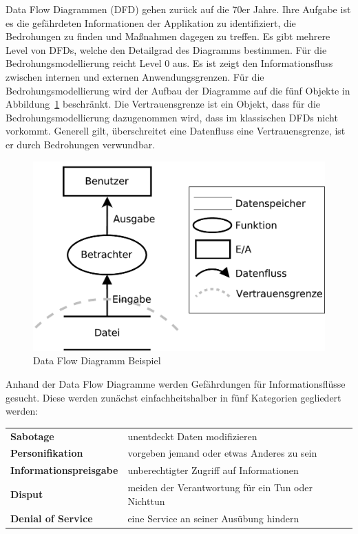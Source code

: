 \documentclass[11pt,a4paper]{report}
\begin{document}
Data Flow Diagrammen (DFD) gehen zurück auf die 70er Jahre. Ihre Aufgabe ist es die gefährdeten Informationen der Applikation zu identifiziert, die Bedrohungen zu finden und Maßnahmen dagegen zu treffen. Es gibt mehrere Level von DFDs, welche den Detailgrad des Diagramms bestimmen. Für die Bedrohungsmodellierung reicht Level 0 aus. Es ist zeigt den Informationsfluss zwischen internen und externen Anwendungsgrenzen. Für die Bedrohungsmodellierung wird der Aufbau der Diagramme auf die fünf Objekte in Abbildung~\ref{fig:dfd_intro} beschränkt. Die Vertrauensgrenze ist ein Objekt, dass für die Bedrohungsmodellierung dazugenommen wird, dass im klassischen DFDs nicht vorkommt. Generell gilt, überschreitet eine Datenfluss eine Vertrauensgrenze, ist er durch Bedrohungen verwundbar.

\begin{figure}[htbp]
\centering
\includegraphics[scale=0.4]{images/dfd_intro.pdf}
\caption{Data Flow Diagramm Beispiel}
\label{fig:dfd_intro}
\end{figure}

Anhand der Data Flow Diagramme werden Gefährdungen für Informationsflüsse gesucht. Diese werden zunächst einfachheitshalber in fünf Kategorien gegliedert werden:

\begin{table}[h] %
\begin{tabularx}{\linewidth}{@{}lX@{}}
\textbf{Sabotage} & unentdeckt Daten modifizieren\\
\textbf{Personifikation} & vorgeben jemand oder etwas Anderes zu sein\\
\textbf{Informationspreisgabe} & unberechtigter Zugriff auf Informationen\\
\textbf{Disput} & meiden der Verantwortung für ein Tun oder Nichttun\\
\textbf{Denial of Service} & eine Service an seiner Ausübung hindern\\
\end{tabularx}
\end{table}
\end{document}
